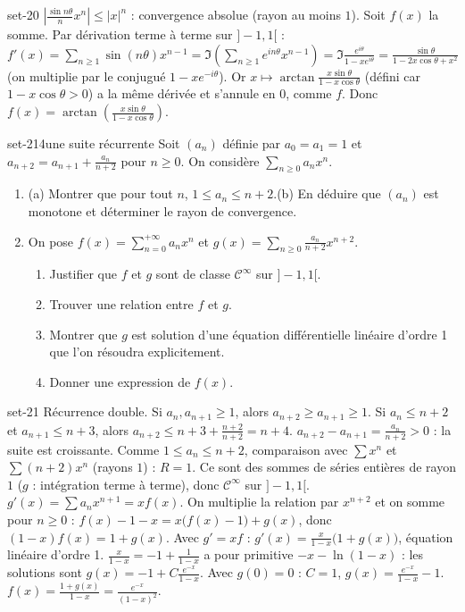 \begin{corrige}{set-20}
 $\left|\frac{\sin n\theta}nx^n\right|\leq|x|^n$ : convergence absolue (rayon au moins $1$).
 Soit $f(x)$ la somme. Par dérivation terme à terme sur $]-1,1[$ :
$f'(x)=\sum_{n\geq1}\sin(n\theta)x^{n-1}=\Im\left(\sum_{n\geq1}e^{in\theta}x^{n-1}\right)=\Im\frac{e^{i\theta}}{1-xe^{i\theta}}=\frac{\sin\theta}{1-2x\cos\theta+x^2}$
(on multiplie par le conjugué $1-xe^{-i\theta}$). Or $x\mapsto\arctan\frac{x\sin\theta}{1-x\cos\theta}$ (défini car $1-x\cos\theta>0$) a la même dérivée
et s'annule en $0$, comme $f$. Donc $f(x)=\arctan\left(\frac{x\sin\theta}{1-x\cos\theta}\right)$.
\end{corrige}

\begin{exo}{set-21}{4}{une suite récurrente}
Soit $(a_n)$ définie par $a_0=a_1=1$ et $a_{n+2}=a_{n+1}+\frac{a_n}{n+2}$ pour $n\geq0$. On considère $\sum_{n\geq0}a_nx^n$.
\begin{enumerate}
\item (a) Montrer que pour tout $n$, $1\leq a_n\leq n+2$.\quad (b) En déduire que $(a_n)$ est monotone et déterminer le rayon de convergence.
\item On pose $f(x)=\sum_{n=0}^{+\infty}a_nx^n$ et $g(x)=\sum_{n\geq0}\frac{a_n}{n+2}x^{n+2}$.
\begin{enumerate}
\item Justifier que $f$ et $g$ sont de classe $\mathcal C^\infty$ sur $]-1,1[$.
\item Trouver une relation entre $f$ et $g$.
\item Montrer que $g$ est solution d'une équation différentielle linéaire d'ordre 1 que l'on résoudra explicitement.
\item Donner une expression de $f(x)$.
\end{enumerate}
\end{enumerate}
\end{exo}

\begin{corrige}{set-21}
 Récurrence double. Si $a_n,a_{n+1}\geq1$, alors $a_{n+2}\geq a_{n+1}\geq1$. Si $a_n\leq n+2$ et $a_{n+1}\leq n+3$, alors
$a_{n+2}\leq n+3+\frac{n+2}{n+2}=n+4$.
 $a_{n+2}-a_{n+1}=\frac{a_n}{n+2}>0$ : la suite est croissante. Comme $1\leq a_n\leq n+2$, comparaison avec $\sum x^n$ et $\sum(n+2)x^n$
(rayons $1$) : $R=1$.
 Ce sont des sommes de séries entières de rayon $1$ ($g$ : intégration terme à terme), donc $\mathcal C^\infty$ sur $]-1,1[$.
 $g'(x)=\sum a_nx^{n+1}=xf(x)$.
 On multiplie la relation par $x^{n+2}$ et on somme pour $n\geq0$ :
$f(x)-1-x=x\big(f(x)-1\big)+g(x)$, donc $(1-x)f(x)=1+g(x)$. Avec $g'=xf$ : $g'(x)=\frac x{1-x}\big(1+g(x)\big)$, équation linéaire d'ordre 1.
$\frac x{1-x}=-1+\frac1{1-x}$ a pour primitive $-x-\ln(1-x)$ : les solutions sont $g(x)=-1+C\frac{e^{-x}}{1-x}$. Avec $g(0)=0$ : $C=1$,
$g(x)=\frac{e^{-x}}{1-x}-1$.
 $f(x)=\frac{1+g(x)}{1-x}=\frac{e^{-x}}{(1-x)^2}$.
\end{corrige}

